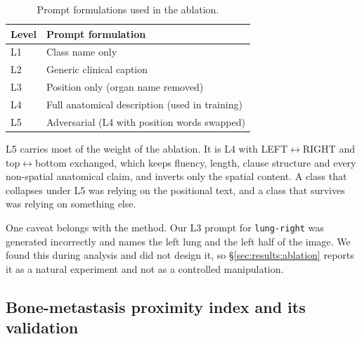 \documentclass[10pt]{article}
\newcommand{\org}[1]{\texttt{#1}}
\begin{document}
\begin{table}[H]
\centering
\caption{Prompt formulations used in the ablation.}
\label{tab:captiondefs}
\begin{tabular}{ll}
\toprule
Level & Prompt formulation \\
\midrule
L1 & Class name only \\
L2 & Generic clinical caption \\
L3 & Position only (organ name removed) \\
L4 & Full anatomical description (used in training) \\
L5 & Adversarial (L4 with position words swapped) \\
\bottomrule
\end{tabular}
\end{table}

L5 carries most of the weight of the ablation. It is L4 with
LEFT$\leftrightarrow$RIGHT and top$\leftrightarrow$bottom exchanged, which keeps
fluency, length, clause structure and every non-spatial anatomical claim, and
inverts only the spatial content. A class that collapses under L5 was relying on
the positional text, and a class that survives was relying on something else.

One caveat belongs with the method. Our L3 prompt for \org{lung-right} was
generated incorrectly and names the left lung and the left half of the image. We
found this during analysis and did not design it, so \S\ref{sec:results:ablation}
reports it as a natural experiment and not as a controlled manipulation.

\subsection{Bone-metastasis proximity index and its validation}
\label{sec:methods:index}
\end{document}
